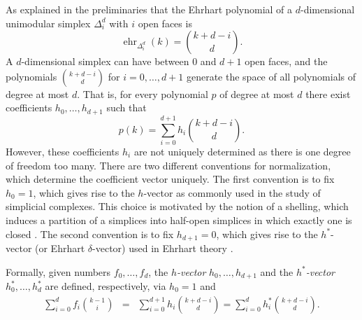 \documentclass[12pt,reqno]{amsart}
\numberwithin{definition}{section}
\theoremstyle{definition}
\newcommand{\ehr}{\operatorname{ehr}}
\begin{document}
As explained in the preliminaries that the Ehrhart polynomial of a $d$-dimensional unimodular simplex $\Delta^d_i$ with $i$ open faces is
\[
  \ehr_{\Delta^d_i}(k) = \binom{k+d-i}{d}.
\]
A $d$-dimensional simplex can have between 0 and $d+1$ open faces, and the polynomials $\binom{k+d-i}{d}$ for $i=0,\ldots,d+1$ generate the space of all polynomials of degree at most $d$. That is, for every polynomial $p$ of degree at most $d$ there exist coefficients $h_0,\ldots,h_{d+1}$ such that
\[
  p(k) = \sum_{i=0}^{d+1} h_i \binom{k+d-i}{d}.
\] 
However, these coefficients $h_i$ are not uniquely determined as there is one degree of freedom too many. There are two different conventions for normalization, which determine the coefficient vector uniquely. The first convention is to fix $h_0=1$, which gives rise to the $h$-vector as commonly used in the study of simplicial complexes. This choice is motivated by the notion of a shelling, which induces a partition of a simplices into half-open simplices in which exactly one is closed \cite{Ziegler1995}. The second convention is to fix $h_{d+1}=0$, which gives rise to the $h^*$-vector (or Ehrhart $\delta$-vector) used in Ehrhart theory \cite{Beck2007}.

Formally, given numbers $f_0,\ldots,f_d$, the \emph{$h$-vector} $h_0,\ldots,h_{d+1}$ and the \emph{$h^*$-vector} $h^*_0,\ldots,h^*_{d}$ are defined, respectively, via $h_0=1$ and
\begin{eqnarray*}
  \sum_{i=0}^{d} f_i \binom{k-1}{i} & = &
  \sum_{i=0}^{d+1} h_i \binom{k+d-i}{d} 
  = \sum_{i=0}^{d} h^*_i \binom{k+d-i}{d}. 
\end{eqnarray*}


\end{document}
